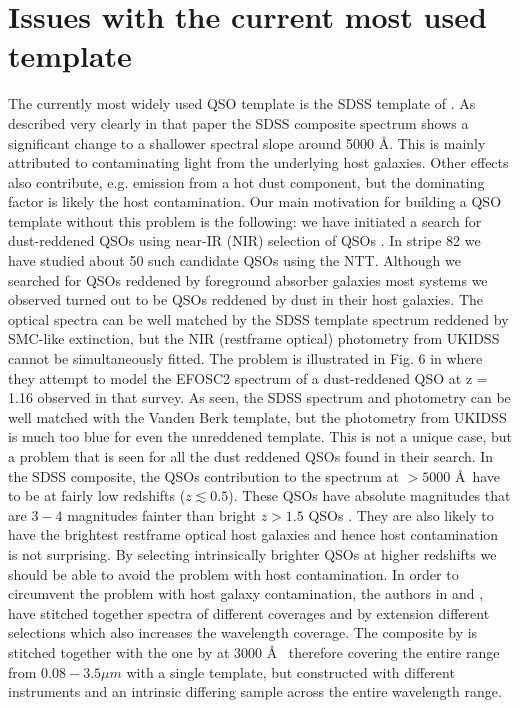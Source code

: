 \documentclass{aa}    %
\newcommand{\sectlabel}[1]{\label{sect:#1}}
\begin{document}
\section{Issues with the current most used template}   \sectlabel{problem}

The currently most widely used QSO template is the SDSS template of \citet{VandenBerk2001}. As described very clearly in that paper the SDSS composite spectrum shows a significant change to a shallower spectral slope around 5000 \AA. This is mainly attributed to contaminating light from the underlying host galaxies. Other effects also contribute, e.g. emission from a hot dust component, but the dominating factor is likely the host contamination. Our main motivation for building a QSO template without this problem is the following: we have initiated a search for dust-reddened QSOs using near-IR (NIR) selection of QSOs \citep{Fynbo2013, Krogager2015}. In stripe 82 we have studied about 50 such candidate QSOs using the NTT. Although we searched for QSOs reddened by foreground absorber galaxies most systems we observed turned out to be QSOs reddened by dust in their host galaxies. The optical spectra can be well matched by the SDSS template spectrum reddened by SMC-like extinction, but the NIR (restframe optical) photometry from UKIDSS cannot be simultaneously fitted. The problem is illustrated in Fig. 6 in \citet{Fynbo2013} where they attempt to model the EFOSC2 spectrum of a dust-reddened QSO at z = 1.16 observed in that survey. As seen, the SDSS spectrum and photometry can be well matched with the Vanden Berk template, but the photometry from UKIDSS is much too blue for even the unreddened template. This is not a unique case, but a problem that is seen for all the dust reddened QSOs found in their search.
In the SDSS composite, the QSOs contribution to the spectrum at $ > 5000$ \AA~have to be at fairly low redshifts ($z \lesssim  0.5$). These QSOs have absolute magnitudes that are $3-4$ magnitudes fainter than bright $z > 1.5$ QSOs \citep[e.g.,][their Fig.~1]{VandenBerk2001}. They are also likely to have the brightest restframe optical host galaxies and hence host contamination is not surprising. By selecting intrinsically brighter QSOs at higher redshifts we should be able to avoid the problem with host contamination.
In order to circumvent the problem with host galaxy contamination, the authors in \citet{Fynbo2013} and \citet{Krogager2015}, have stitched together spectra of different coverages and by extension different selections which also increases the wavelength coverage. The composite by \citet{Glikman2006} is stitched together with the one by \citet{VandenBerk2001} at $3000$ \AA~ therefore covering the entire range from $0.08 - 3.5 \mu m$ with a single template, but constructed with different instruments and an intrinsic differing sample across the entire wavelength range. 
\end{document}
